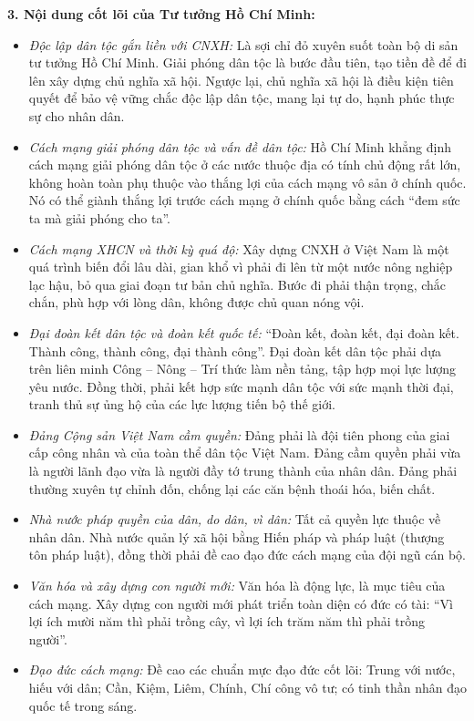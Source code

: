 \documentclass[12pt,a4paper]{article}
\begin{document}
\noindent
\textbf{3. Nội dung cốt lõi của Tư tưởng Hồ Chí Minh:}
\begin{itemize}
    \item \textit{Độc lập dân tộc gắn liền với CNXH:} Là sợi chỉ đỏ xuyên suốt toàn bộ di sản tư tưởng Hồ Chí Minh. Giải phóng dân tộc là bước đầu tiên, tạo tiền đề để đi lên xây dựng chủ nghĩa xã hội. Ngược lại, chủ nghĩa xã hội là điều kiện tiên quyết để bảo vệ vững chắc độc lập dân tộc, mang lại tự do, hạnh phúc thực sự cho nhân dân.
    \item \textit{Cách mạng giải phóng dân tộc và vấn đề dân tộc:} Hồ Chí Minh khẳng định cách mạng giải phóng dân tộc ở các nước thuộc địa có tính chủ động rất lớn, không hoàn toàn phụ thuộc vào thắng lợi của cách mạng vô sản ở chính quốc. Nó có thể giành thắng lợi trước cách mạng ở chính quốc bằng cách ``đem sức ta mà giải phóng cho ta''.
    \item \textit{Cách mạng XHCN và thời kỳ quá độ:} Xây dựng CNXH ở Việt Nam là một quá trình biến đổi lâu dài, gian khổ vì phải đi lên từ một nước nông nghiệp lạc hậu, bỏ qua giai đoạn tư bản chủ nghĩa. Bước đi phải thận trọng, chắc chắn, phù hợp với lòng dân, không được chủ quan nóng vội.
    \item \textit{Đại đoàn kết dân tộc và đoàn kết quốc tế:} ``Đoàn kết, đoàn kết, đại đoàn kết. Thành công, thành công, đại thành công''. Đại đoàn kết dân tộc phải dựa trên liên minh Công -- Nông -- Trí thức làm nền tảng, tập hợp mọi lực lượng yêu nước. Đồng thời, phải kết hợp sức mạnh dân tộc với sức mạnh thời đại, tranh thủ sự ủng hộ của các lực lượng tiến bộ thế giới.
    \item \textit{Đảng Cộng sản Việt Nam cầm quyền:} Đảng phải là đội tiên phong của giai cấp công nhân và của toàn thể dân tộc Việt Nam. Đảng cầm quyền phải vừa là người lãnh đạo vừa là người đầy tớ trung thành của nhân dân. Đảng phải thường xuyên tự chỉnh đốn, chống lại các căn bệnh thoái hóa, biến chất.
    \item \textit{Nhà nước pháp quyền của dân, do dân, vì dân:} Tất cả quyền lực thuộc về nhân dân. Nhà nước quản lý xã hội bằng Hiến pháp và pháp luật (thượng tôn pháp luật), đồng thời phải đề cao đạo đức cách mạng của đội ngũ cán bộ.
    \item \textit{Văn hóa và xây dựng con người mới:} Văn hóa là động lực, là mục tiêu của cách mạng. Xây dựng con người mới phát triển toàn diện có đức có tài: ``Vì lợi ích mười năm thì phải trồng cây, vì lợi ích trăm năm thì phải trồng người''.
    \item \textit{Đạo đức cách mạng:} Đề cao các chuẩn mực đạo đức cốt lõi: Trung với nước, hiếu với dân; Cần, Kiệm, Liêm, Chính, Chí công vô tư; có tinh thần nhân đạo quốc tế trong sáng.
\end{itemize}
\end{document}
